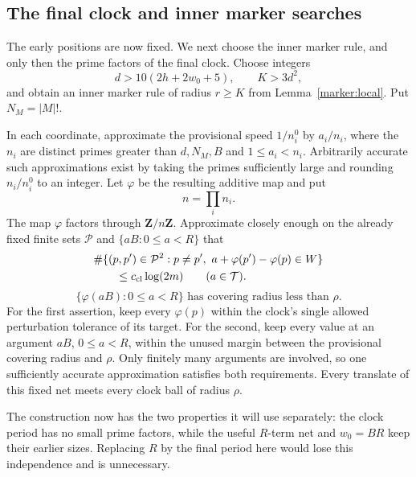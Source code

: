 \subsection{The final clock and inner marker searches}

The early positions are now fixed.  We next choose the inner marker rule,
and only then the prime factors of the final clock.  Choose integers
\begin{equation}\label{schedule:inner-marker-parameters}
 d>10(2h+2w_0+5),\qquad K>3d^2,
\end{equation}
and obtain an inner marker rule of radius $r\ge K$ from
Lemma~\ref{marker:local}.  Put $N_M=|M|!$.

In each coordinate, approximate the provisional speed $1/n_i^0$ by
$a_i/n_i$, where the $n_i$ are distinct primes greater than $d,N_M,B$ and
$1\le a_i<n_i$.  Arbitrarily accurate such approximations exist by taking
the primes sufficiently large and rounding $n_i/n_i^0$ to an integer.
Let $\varphi$ be the resulting additive map and put
\begin{equation}\label{schedule:final-period}
 n=\prod_i n_i.
\end{equation}
The map $\varphi$ factors through $\mathbf Z/n\mathbf Z$.  Approximate
closely enough on the already fixed finite sets
$\mathcal P$ and $\{aB:0\le a<R\}$ that
\begin{equation}\label{schedule:clock-roster}
\begin{aligned}
 &\#\{(p,p')\in\mathcal P^2:p\ne p',\
 a+\varphi(p')-\varphi(p)\in W\}\\
 &\qquad\le c_{\rm cl}\log(2m)\qquad(a\in\mathcal T).
\end{aligned}
\end{equation}
\begin{equation}\label{schedule:final-net}
 \{\varphi(aB):0\le a<R\}
 \text{ has covering radius less than }\rho.
\end{equation}
For the first assertion, keep every $\varphi(p)$ within the clock's
single allowed perturbation tolerance of its target. For the second,
keep every value at an argument $aB$, $0\le a<R$, within the unused
margin between the provisional covering radius and $\rho$. Only finitely
many arguments are involved, so one sufficiently accurate approximation
satisfies both requirements. Every translate of this fixed net meets
every clock ball of radius $\rho$.

The construction now has the two properties it will use separately:
the clock period has no small prime factors, while the useful $R$-term
net and $w_0=BR$ keep their earlier sizes. Replacing $R$ by the final
period here would lose this independence and is unnecessary.


